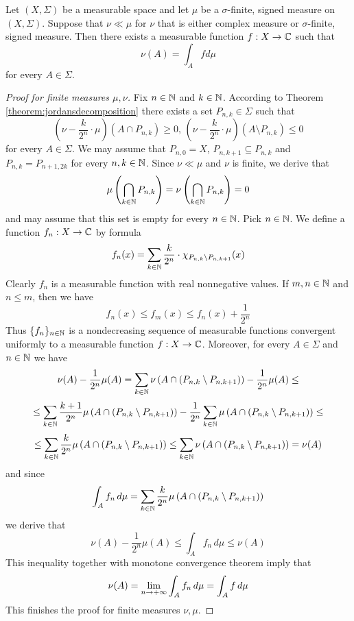 \begin{theorem}\label{theorem:radonnikodymmain}
Let $(X,\Sigma)$ be a measurable space and let $\mu$ be a $\sigma$-finite, signed measure on $(X,\Sigma)$. Suppose that $\nu \ll \mu$ for $\nu$ that is either complex measure or $\sigma$-finite, signed measure. Then there exists a measurable function $f:X\rightarrow {\mathbb C}$ such that
$$\nu(A) = \int_A f d\mu$$
for every $A\in \Sigma$.
\end{theorem}
\begin{proof}[Proof for finite measures $\mu,\nu$]
Fix $n\in {\mathbb N}$ and $k\in {\mathbb N}$. According to Theorem \ref{theorem:jordansdecomposition} there exists a set $P_{n,k}\in \Sigma$ such that
$$\left(\nu - \frac{k}{2^n}\cdot \mu\right)\left(A\cap P_{n,k}\right)\geq 0,\,\left(\nu - \frac{k}{2^n}\cdot \mu\right)\left(A\setminus P_{n,k}\right)\leq 0$$
for every $A\in \Sigma$. We may assume that $P_{n,0}=X$, $P_{n,k+1}\subseteq P_{n,k}$ and $P_{n,k} =P_{n+1,2k}$ for every $n, k\in {\mathbb N}$. Since $\nu \ll \mu$ and $\nu$ is finite, we derive that
$$\mu\left(\bigcap_{k\in {\mathbb N}}P_{n,k}\right) = \nu\left(\bigcap_{k\in {\mathbb N}}P_{n,k}\right)=0$$
and may assume that this set is empty for every $n\in {\mathbb N}$. Pick $n\in {\mathbb N}$. We define a function $f_n:X\rightarrow {\mathbb C}$ by formula
$$f_n(x) =\sum_{k\in {\mathbb N}} \frac{k}{2^n}\cdot \chi_{P_{n,k}\setminus P_{n,k+1}}(x)$$
Clearly $f_n$ is a measurable function with real nonnegative values. If $m,n\in {\mathbb N}$ and $n\leq m$, then we have
$$f_n(x)\leq f_m(x)\leq f_n(x)+\frac{1}{2^n}$$
Thus $\{f_n\}_{n\in {\mathbb N}}$ is a nondecreasing sequence of measurable functions convergent uniformly to a measurable function $f:X\rightarrow {\mathbb C}$. Moreover, for every $A\in \Sigma$ and $n\in {\mathbb N}$ we have
$$\nu(A)-\frac{1}{2^n}\mu(A) = \sum_{k\in {\mathbb N}}\nu\left(A\cap \left(P_{n,k}\setminus P_{n,k+1}\right)\right)-\frac{1}{2^n}\mu(A)  \leq$$
$$\leq \sum_{k\in {\mathbb N}}\frac{k+1}{2^n}\mu\left(A\cap \left(P_{n,k}\setminus P_{n,k+1}\right)\right) - \frac{1}{2^n}\sum_{k\in {\mathbb N}}\mu\left(A\cap \left(P_{n,k}\setminus P_{n,k+1}\right)\right) \leq  $$
$$\leq  \sum_{k\in {\mathbb N}}\frac{k}{2^n}\mu\left(A\cap \left(P_{n,k}\setminus P_{n,k+1}\right)\right)\leq \sum_{k\in {\mathbb N}}\nu\left(A\cap \left(P_{n,k}\setminus P_{n,k+1}\right)\right) = \nu(A)$$
and since
$$\int_Af_n\,d\mu =  \sum_{k\in {\mathbb N}}\frac{k}{2^n}\mu\left(A\cap \left(P_{n,k}\setminus P_{n,k+1}\right)\right)$$
we derive that
$$\nu(A)-\frac{1}{2^n}\mu(A) \leq \int_Af_n\,d\mu \leq \nu(A)$$
This inequality together with monotone convergence theorem imply that
$$\nu(A) =  \lim_{n\rightarrow +\infty}\int_Af_n\,d\mu = \int_Af\,d\mu$$
This finishes the proof for finite measures $\nu,\mu$.
\end{proof}

